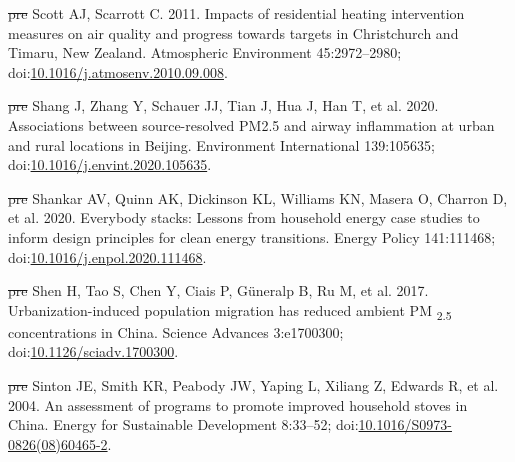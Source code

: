 \documentclass[
  letterpaper,
  DIV=11,
  numbers=noendperiod]{scrartcl}
\newlength{\cslhangindent}
\newenvironment{CSLReferences}[2] %
 {\begin{list}{}{%
  \setlength{\itemindent}{0pt} %
  \setlength{\leftmargin}{0pt} %
  \setlength{\parsep}{0pt} %
  \ifodd #1
   \setlength{\leftmargin}{\cslhangindent} %
   \setlength{\itemindent}{-1\cslhangindent} %
  \fi
  \setlength{\itemsep}{#2\baselineskip}}} %
 {\end{list}} %
\providecommand{\DIFdeltex}[1]{{\protect\color{red}\sout{#1}}}                      %
\providecommand{\DIFaddbegin}{} %
\providecommand{\DIFaddend}{} %
\providecommand{\DIFdelbegin}{} %
\providecommand{\DIFdelend}{} %
\providecommand{\DIFdel}[1]{\texorpdfstring{\DIFdeltex{#1}}{}} %
\newcommand{\DIFscaledelfig}{0.5}
\newlength{\DIFdelgraphicswidth} %
\newlength{\DIFdelgraphicsheight} %
\newcommand{\DIFaddincludegraphics}[2][]{{\color{blue}\fbox{\DIFOincludegraphics[#1]{#2}}}} %
\newcommand{\DIFdelincludegraphics}[2][]{%
\sbox{\DIFdelgraphicsbox}{\DIFOincludegraphics[#1]{#2}}%
\settoboxwidth{\DIFdelgraphicswidth}{\DIFdelgraphicsbox} %
\settoboxtotalheight{\DIFdelgraphicsheight}{\DIFdelgraphicsbox} %
\scalebox{\DIFscaledelfig}{%
\parbox[b]{\DIFdelgraphicswidth}{\usebox{\DIFdelgraphicsbox}\\[-\baselineskip] \rule{\DIFdelgraphicswidth}{0em}}\llap{\resizebox{\DIFdelgraphicswidth}{\DIFdelgraphicsheight}{%
\setlength{\unitlength}{\DIFdelgraphicswidth}%
\begin{picture}(1,1)%
\thicklines\linethickness{2pt} %
{\color[rgb]{1,0,0}\put(0,0){\framebox(1,1){}}}%
{\color[rgb]{1,0,0}\put(0,0){\line( 1,1){1}}}%
{\color[rgb]{1,0,0}\put(0,1){\line(1,-1){1}}}%
\end{picture}%
}\hspace*{3pt}}} %
} %
\DeclareRobustCommand{\DIFaddbegin}{\DIFOaddbegin \let\includegraphics\DIFaddincludegraphics} %
\DeclareRobustCommand{\DIFaddend}{\DIFOaddend \let\includegraphics\DIFOincludegraphics} %
\DeclareRobustCommand{\DIFdelbegin}{\DIFOdelbegin \let\includegraphics\DIFdelincludegraphics} %
\DeclareRobustCommand{\DIFdelend}{\DIFOaddend \let\includegraphics\DIFOincludegraphics} %
\begin{document}
\begin{CSLReferences}{1}{1}
\DIFdelbegin %
\DIFdel{pre}%
\DIFdelend \DIFaddbegin {}
\DIFaddend Scott AJ, Scarrott C. 2011. Impacts of residential heating intervention
measures on air quality and progress towards targets in {Christchurch}
and {Timaru}, {New Zealand}. Atmospheric Environment 45:2972--2980;
doi:\href{https://doi.org/10.1016/j.atmosenv.2010.09.008}{10.1016/j.atmosenv.2010.09.008}.

\DIFdelbegin %
\DIFdel{pre}%
\DIFdelend \DIFaddbegin {}
\DIFaddend Shang J, Zhang Y, Schauer JJ, Tian J, Hua J, Han T, et al. 2020.
Associations between source-resolved {PM2}.5 and airway inflammation at
urban and rural locations in {Beijing}. Environment International
139:105635;
doi:\href{https://doi.org/10.1016/j.envint.2020.105635}{10.1016/j.envint.2020.105635}.

\DIFdelbegin %
\DIFdel{pre}%
\DIFdelend \DIFaddbegin {}
\DIFaddend Shankar AV, Quinn AK, Dickinson KL, Williams KN, Masera O, Charron D, et
al. 2020. Everybody stacks: {Lessons} from household energy case studies
to inform design principles for clean energy transitions. Energy Policy
141:111468;
doi:\href{https://doi.org/10.1016/j.enpol.2020.111468}{10.1016/j.enpol.2020.111468}.

\DIFdelbegin %
\DIFdel{pre}%
\DIFdelend \DIFaddbegin {}
\DIFaddend Shen H, Tao S, Chen Y, Ciais P, Güneralp B, Ru M, et al. 2017.
Urbanization-induced population migration has reduced ambient {PM}
{\textsubscript{2.5}} concentrations in {China}. Science Advances
3:e1700300;
doi:\href{https://doi.org/10.1126/sciadv.1700300}{10.1126/sciadv.1700300}.

\DIFdelbegin %
\DIFdel{pre}%
\DIFdelend \DIFaddbegin {}
\DIFaddend Sinton JE, Smith KR, Peabody JW, Yaping L, Xiliang Z, Edwards R, et al.
2004. An assessment of programs to promote improved household stoves in
{China}. Energy for Sustainable Development 8:33--52;
doi:\href{https://doi.org/10.1016/S0973-0826(08)60465-2}{10.1016/S0973-0826(08)60465-2}.


\end{CSLReferences}
\end{document}
